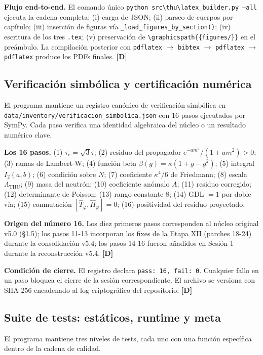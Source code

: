 ﻿\documentclass[11pt,letterpaper]{article}
\begin{document}
\textbf{Flujo end-to-end.} El comando único \texttt{python src\textbackslash thu\textbackslash latex\_builder.py --all} ejecuta la cadena completa: (i) carga de JSON; (ii) parseo de cuerpos por capítulo; (iii) inserción de figuras vía \texttt{\_load\_figures\_by\_section()}; (iv) escritura de los tres \texttt{.tex}; (v) preservación de \texttt{\textbackslash graphicspath\{\{figures/\}\}} en el preámbulo. La compilación posterior con \texttt{pdflatex} $\to$ \texttt{bibtex} $\to$ \texttt{pdflatex} $\to$ \texttt{pdflatex} produce los PDFs finales. \textbf{[D]}
\subsection{Verificación simbólica y certificación numérica}
El programa mantiene un registro canónico de verificación simbólica en \texttt{data/inventory/verificacion\_simbolica.json} con 16 pasos ejecutados por SymPy. Cada paso verifica una identidad algebraica del núcleo o un resultado numérico clave.

\textbf{Los 16 pasos.} (1) $\tau_c = \sqrt{3}\tau$; (2) residuo del propagador $e^{-am^2}/(1+am^2) > 0$; (3) ramas de Lambert-W; (4) función beta $\beta(g) = \kappa(1+g-g^2)$; (5) integral $I_2(a,b)$; (6) condición sobre $N$; (7) coeficiente $\kappa^4/6$ de Friedmann; (8) escala $\Lambda_{\mathrm{THU}}$; (9) masa del neutrón; (10) coeficiente anómalo $A$; (11) residuo corregido; (12) determinante de Poisson; (13) rango constante 8; (14) GDL $= 1$ por doble vía; (15) conmutación $[\hat{T}_\varphi, \hat{H}_\varphi] = 0$; (16) positividad del residuo proyectado.

\textbf{Origen del número 16.} Los diez primeros pasos corresponden al núcleo original v5.0 (§1.5); los pasos 11-13 incorporan los fixes de la Etapa XII (parches 18-24) durante la consolidación v5.4; los pasos 14-16 fueron añadidos en Sesión 1 durante la reconstrucción v5.4. \textbf{[D]}

\textbf{Condición de cierre.} El registro declara \texttt{pass: 16, fail: 0}. Cualquier fallo en un paso bloquea el cierre de la sesión correspondiente. El archivo se versiona con SHA-256 encadenado al log criptográfico del repositorio. \textbf{[D]}
\subsection{Suite de tests: estáticos, runtime y meta}
El programa mantiene tres niveles de tests, cada uno con una función específica dentro de la cadena de calidad.
\end{document}
